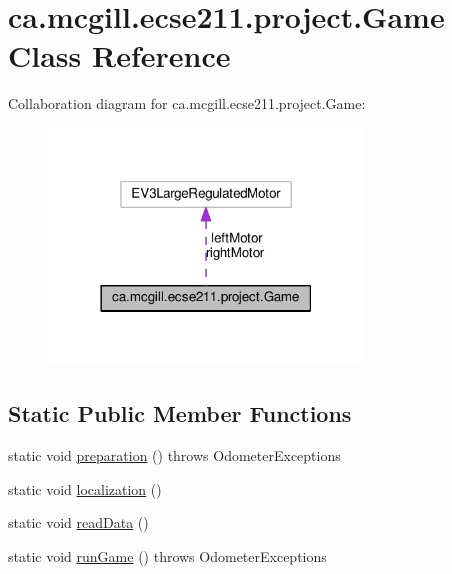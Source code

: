 \hypertarget{classca_1_1mcgill_1_1ecse211_1_1project_1_1_game}{}\section{ca.\+mcgill.\+ecse211.\+project.\+Game Class Reference}
\label{classca_1_1mcgill_1_1ecse211_1_1project_1_1_game}


Collaboration diagram for ca.\+mcgill.\+ecse211.\+project.\+Game\+:
\nopagebreak
\begin{figure}[H]
\begin{center}
\leavevmode
\includegraphics[width=237pt]{classca_1_1mcgill_1_1ecse211_1_1project_1_1_game__coll__graph}
\end{center}
\end{figure}
\subsection*{Static Public Member Functions}
\begin{DoxyCompactItemize}
\item 
static void \hyperlink{classca_1_1mcgill_1_1ecse211_1_1project_1_1_game_a1bcbd1c19309c65a6887ae19bde66765}{preparation} ()  throws Odometer\+Exceptions 
\item 
static void \hyperlink{classca_1_1mcgill_1_1ecse211_1_1project_1_1_game_ad1a9b39b2449607da3320b28c72ba379}{localization} ()
\item 
static void \hyperlink{classca_1_1mcgill_1_1ecse211_1_1project_1_1_game_ac9f3ddab796dea6e753bfde7b87fa1b2}{read\+Data} ()
\item 
static void \hyperlink{classca_1_1mcgill_1_1ecse211_1_1project_1_1_game_afaee4e6015d5219e948a055067261de6}{run\+Game} ()  throws Odometer\+Exceptions 
\end{DoxyCompactItemize}
